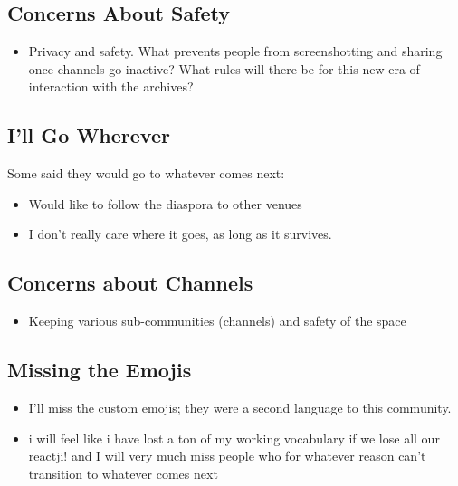 \documentclass[
]{book}
\providecommand{\tightlist}{%
  \setlength{\itemsep}{0pt}\setlength{\parskip}{0pt}}
\begin{document}
\subsection{Concerns About Safety}\label{concerns-about-safety}

\begin{itemize}
\tightlist
\item
  Privacy and safety. What prevents people from screenshotting and sharing once channels go inactive? What rules will there be for this new era of interaction with the archives?
\end{itemize}

\subsection{I'll Go Wherever}\label{ill-go-wherever}

Some said they would go to whatever comes next:

\begin{itemize}
\tightlist
\item
  Would like to follow the diaspora to other venues
\item
  I don't really care where it goes, as long as it survives.
\end{itemize}

\subsection{Concerns about Channels}\label{concerns-about-channels}

\begin{itemize}
\tightlist
\item
  Keeping various sub-communities (channels) and safety of the space
\end{itemize}

\subsection{Missing the Emojis}\label{missing-the-emojis}

\begin{itemize}
\tightlist
\item
  I'll miss the custom emojis; they were a second language to this community.
\item
  i will feel like i have lost a ton of my working vocabulary if we lose all our reactji! and I will very much miss people who for whatever reason can't transition to whatever comes next
\end{itemize}
\end{document}
